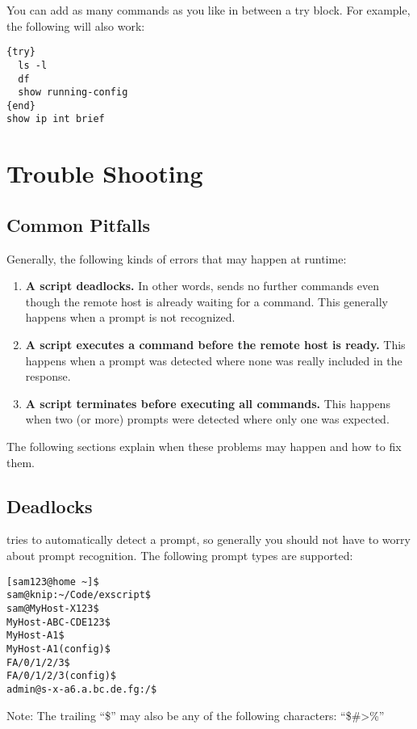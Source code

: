 You can add as many commands as you like in between a try block. For 
example, the following will also work: 

\begin{lstlisting}
{try}
  ls -l
  df
  show running-config
{end}
show ip int brief
\end{lstlisting}


\section{Trouble Shooting}
\subsection{Common Pitfalls}

Generally, the following kinds of errors that may happen at runtime:

\begin{enumerate}
\item {\bf A script deadlocks.} In other words, \product sends no further commands even though the remote host is already waiting for a command. This generally happens when a prompt is not recognized. 
\item {\bf A script executes a command before the remote host is ready.} This happens when a prompt was detected where none was really included in the response. 
\item {\bf A script terminates before executing all commands.} This happens when two (or more) prompts were detected where only one was expected. 
\end{enumerate}

The following sections explain when these problems may happen and how to fix them. 

\subsection{Deadlocks}

\product tries to automatically detect a prompt, so generally you should 
not have to worry about prompt recognition. The following prompt types 
are supported: 

\begin{lstlisting}
[sam123@home ~]$
sam@knip:~/Code/exscript$
sam@MyHost-X123$
MyHost-ABC-CDE123$
MyHost-A1$
MyHost-A1(config)$
FA/0/1/2/3$
FA/0/1/2/3(config)$
admin@s-x-a6.a.bc.de.fg:/$
\end{lstlisting}

Note: The trailing ``\$'' may also be any of the following characters: ``\$\#>\%''

